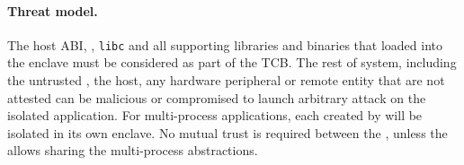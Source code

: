 %
%
%
%
%
%
%

\paragraph{Threat model.}
The host ABI, \libos{}, {\tt libc} and all supporting libraries and binaries
that loaded into the enclave
must be considered as part of the TCB.
The rest of system, including the untrusted \pal{}, the host, any hardware peripheral or remote entity that are not attested
can be malicious or compromised
to launch arbitrary attack on the isolated application.
For multi-process applications, each \picoproc{} created by \graphenesgx{}
will be isolated in its own enclave.
No mutual trust is required between the \picoprocs{},
unless the 
allows sharing the multi-process abstractions.


